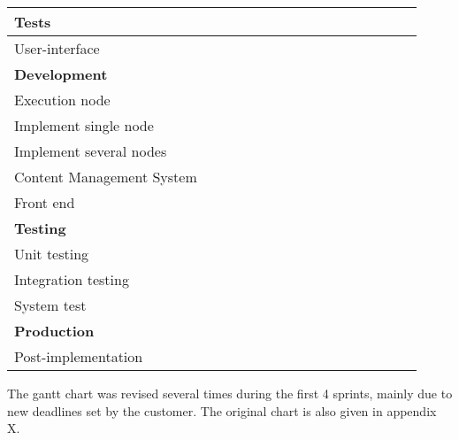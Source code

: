 \begin{table}
\begin{tabular}[h]{|l|l|l|l|l|l|l|l|l|l|l|l|l|l|l|l|}
\hline
Tests &&&\cellcolor{RoyalBlue}&\cellcolor{RoyalBlue}&\cellcolor{RoyalBlue}&\cellcolor{RoyalBlue}&&&&&&&&&  \\
\hline
User-interface&&&&&\cellcolor{MidnightBlue}&\cellcolor{MidnightBlue}&\cellcolor{MidnightBlue}&\cellcolor{MidnightBlue}&\cellcolor{MidnightBlue}&&&&&&  \\
\hline
\textbf{Development}&&&&\cellcolor{Purple}&\cellcolor{Purple}&\cellcolor{Purple}&\cellcolor{Purple}&\cellcolor{Purple}&\cellcolor{Purple}&\cellcolor{Purple}&\cellcolor{Purple}&&&&  \\
\hline
Execution node&&&&&&&&\cellcolor{Orchid}&\cellcolor{Orchid}&\cellcolor{Orchid}&\cellcolor{Orchid}&&&&  \\
\hline
Implement single node&&&&&&&&\cellcolor{Thistle}&\cellcolor{Thistle}&\cellcolor{Thistle}&&&&&  \\
\hline
Implement several nodes&&&&&&&&&\cellcolor{Thistle}&\cellcolor{Thistle}&&&&&  \\
\hline
Content Management System&&&&&&&&&&&\cellcolor{Orchid}&&&&  \\
\hline
Front end&&&&\cellcolor{Orchid}&\cellcolor{Orchid}&\cellcolor{Orchid}&\cellcolor{Orchid}&\cellcolor{Orchid}&\cellcolor{Orchid}&\cellcolor{Orchid}&\cellcolor{Orchid}&&&&  \\
\hline
\textbf{Testing}&&&&&&&\cellcolor{Red}&\cellcolor{Red}&\cellcolor{Red}&\cellcolor{Red}&\cellcolor{Red}&\cellcolor{Red}&\cellcolor{Red}&\cellcolor{Red}&\cellcolor{Red}  \\
\hline
Unit testing &&&&&&&\cellcolor{Orchid}&\cellcolor{Orchid}&\cellcolor{Orchid}&\cellcolor{Orchid}&\cellcolor{Orchid}&\cellcolor{Orchid}&\cellcolor{Orchid}&\cellcolor{Orchid}&\cellcolor{Orchid}  \\
\hline
Integration testing&&&&&&&&&\cellcolor{Melon}&\cellcolor{Melon}&\cellcolor{Melon}&\cellcolor{Melon}&\cellcolor{Melon}&\cellcolor{Melon}&\cellcolor{Melon}  \\
\hline
System test&&&&&&&&&\cellcolor{Melon}&\cellcolor{Melon}&\cellcolor{Melon}&\cellcolor{Melon}&\cellcolor{Melon}&\cellcolor{Melon}&\cellcolor{Melon}  \\
\hline
\textbf{Production}&&&&&&&&&&&&&&\cellcolor{MidnightBlue}&\cellcolor{MidnightBlue}  \\
\hline
Post-implementation&&&&&&&&&&&&&&&\cellcolor{Plum} \\
\hline
\end{tabular}
\end{table}

The gantt chart was revised several times during the first 4 sprints,
mainly due to new deadlines set by the customer. The original chart is
also given in appendix X.

